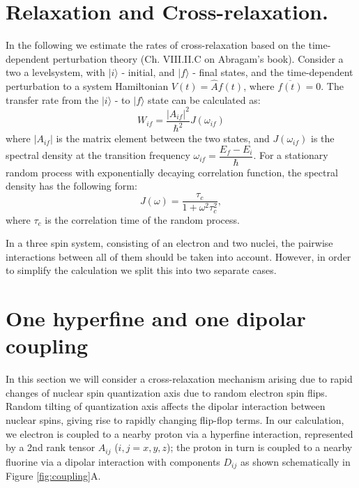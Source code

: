 \documentclass[a4paper, 12pt]{article}
\begin{document}
\section{Relaxation and Cross-relaxation.}
In the following we estimate the rates of cross-relaxation based on the time-dependent perturbation theory (Ch. VIII.II.C on Abragam's book). Consider a two a levelsystem, with $\vert i \rangle$ - initial, and $\vert f \rangle$ - final states, and the time-dependent perturbation to a system Hamiltonian $V(t) = \hat{A} f(t)$, where $\overline{f(t)} = 0$. The transfer rate from the $\vert i \rangle$ - to  $\vert f \rangle$ state can be calculated as:
\begin{equation} \label{eq:rate}
 W_{if} = \dfrac{ \vert A_{if} \vert ^2  }{\hbar^2} J(\omega_{if}) 
\end{equation}
where $\vert A_{if} \vert$ is the matrix element between the two states, and $J({\omega_{if}})$ is the spectral density at the transition frequency $\omega_{if} = \dfrac{E_f - E_i}{\hbar}$. For a stationary random process with exponentially decaying correlation function, the spectral density has the following form:
\begin{equation}
J(\omega) = \dfrac{\tau_c}{1+\omega^2\tau_c^2}, 
\end{equation} 
where $\tau_c$ is the correlation time of the random process.

In a three spin system, consisting of an electron and two nuclei, the pairwise interactions between all of them should be taken into account. However, in order to simplify the calculation we split this into two separate cases. 
\section{One hyperfine and one dipolar coupling} \label{sec: case A}
In this section we will consider a cross-relaxation mechanism arising due to rapid changes of nuclear spin quantization axis due to random electron spin flips. Random tilting of quantization axis affects the dipolar interaction between nuclear spins, giving rise to rapidly changing flip-flop terms.
In our calculation, we electron is coupled to a nearby proton via a hyperfine interaction, represented by a 2nd rank tensor $A_{ij}$ ($i,j=x,y,z$); the proton in turn is coupled to a nearby fluorine via a dipolar interaction with components $D_{ij}$ as shown schematically in Figure \ref{fig:coupling}A.
\end{document}
